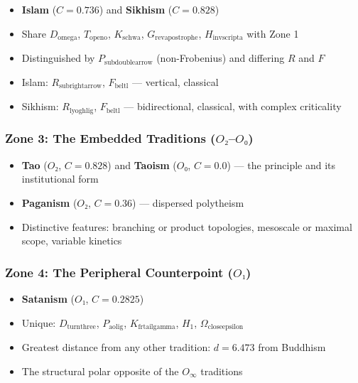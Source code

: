 \documentclass[12pt,a4paper]{article}
\begin{document}
\begin{itemize}
    \item \textbf{Islam} ($C = 0.736$) and \textbf{Sikhism} ($C = 0.828$)
    \item Share $D_{\text{omega}}$, $T_{\text{openo}}$, $K_{\text{schwa}}$, $G_{\text{revapostrophe}}$, $H_{\text{invscripta}}$ with Zone 1
    \item Distinguished by $P_{\text{subdoublearrow}}$ (non-Frobenius) and differing $R$ and $F$
    \item Islam: $R_{\text{subrightarrow}}$, $F_{\text{beltl}}$ --- vertical, classical
    \item Sikhism: $R_{\text{lyoghlig}}$, $F_{\text{beltl}}$ --- bidirectional, classical, with complex criticality
\end{itemize}

\subsubsection{Zone 3: The Embedded Traditions ($O₂$--$O₀$)}

\begin{itemize}
    \item \textbf{Tao} ($O₂$, $C = 0.828$) and \textbf{Taoism} ($O₀$, $C = 0.0$) --- the principle and its institutional form
    \item \textbf{Paganism} ($O₂$, $C = 0.36$) --- dispersed polytheism
    \item Distinctive features: branching or product topologies, mesoscale or maximal scope, variable kinetics
\end{itemize}

\subsubsection{Zone 4: The Peripheral Counterpoint ($O₁$)}

\begin{itemize}
    \item \textbf{Satanism} ($O₁$, $C = 0.2825$)
    \item Unique: $D_{\text{turnthree}}$, $P_{\text{aolig}}$, $K_{\text{frtailgamma}}$, $H_1$, $\Omega_{\text{closeepsilon}}$
    \item Greatest distance from any other tradition: $d = 6.473$ from Buddhism
    \item The structural polar opposite of the $O_{\infty}$ traditions
\end{itemize}
\end{document}
